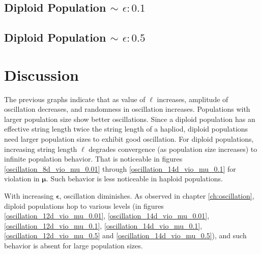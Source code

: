 \subsection{Diploid Population $\mathtt{\sim}$ $\epsilon: 0.1$}

\subsection{Diploid Population $\mathtt{\sim}$ $\epsilon: 0.5$}


\section{Discussion}
The previous graphs indicate that as value of $\ell$ increases, 
amplitude of oscillation decreases, and randomness in oscillation increases. 
Populations with larger population size show better oscillations. 
Since a diploid population has an effective string length twice the string length of a hapliod, 
diploid populations need larger population sizes to exhibit good oscillation. 
For diploid populations, increasing string length $\ell$ 
degrades convergence (as population size increases) to infinite population behavior. 
That is noticeable in figures 
\ref{oscillation_8d_vio_mu_0.01} through \ref{oscillation_14d_vio_mu_0.1} for violation in $\bm{\mu}$. 
Such behavior is less noticeable in haploid populations. 

With increasing $\bm{\epsilon}$, oscillation diminishes.  
As observed in chapter \ref{ch:oscillation}, diploid populations hop to various levels 
(in figures \ref{oscillation_12d_vio_mu_0.01}, \ref{oscillation_14d_vio_mu_0.01}, \ref{oscillation_12d_vio_mu_0.1}, 
\ref{oscillation_14d_vio_mu_0.1}, \ref{oscillation_12d_vio_mu_0.5} and \ref{oscillation_14d_vio_mu_0.5}), 
and such behavior is absent for large population sizes.

